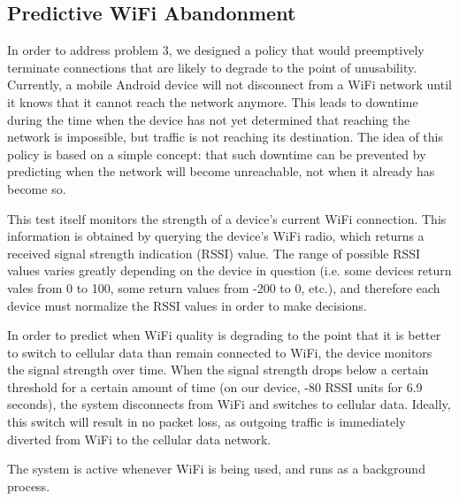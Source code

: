 \subsection{Predictive WiFi Abandonment}
In order to address problem 3, we designed a policy that would preemptively terminate connections that are likely to degrade to the point of unusability. Currently, a mobile Android device will not disconnect from a WiFi network until it knows that it cannot reach the network anymore. This leads to downtime during the time when the device has not yet determined that reaching the network is impossible, but traffic is not reaching its destination. The idea of this policy is based on a simple concept: that such downtime can be prevented by predicting when the network will become unreachable, not when it already has become so.

This test itself monitors the strength of a device's current WiFi connection. This information is obtained by querying the device's WiFi radio, which returns a received signal strength indication (RSSI) value. The range of possible RSSI values varies greatly depending on the device in question (i.e. some devices return vales from 0 to 100, some return values from -200 to 0, etc.), and therefore each device must normalize the RSSI values in order to make decisions.

In order to predict when WiFi quality is degrading to the point that it is better to switch to cellular data than remain connected to WiFi, the device monitors the signal strength over time. When the signal strength drops below a certain threshold for a certain amount of time (on our device, -80 RSSI units for 6.9 seconds), the system disconnects from WiFi and switches to cellular data. Ideally, this switch will result in no packet loss, as outgoing traffic is immediately diverted from WiFi to the cellular data network.

The system is active whenever WiFi is being used, and runs as a background process.
